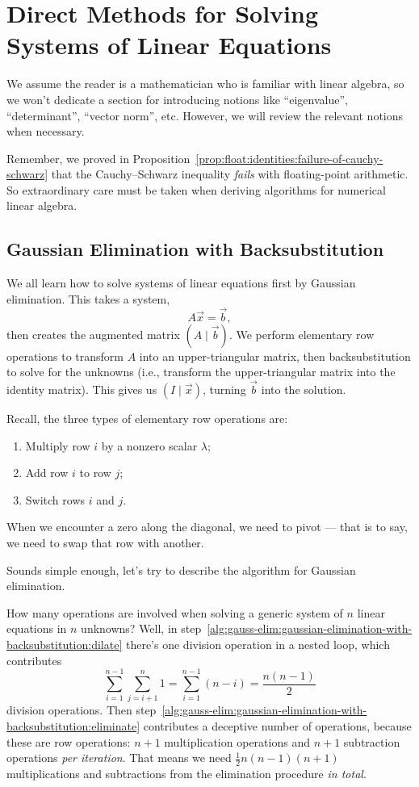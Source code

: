 \chapter{Direct Methods for Solving Systems of Linear Equations}

We assume the reader is a mathematician who is familiar with linear
algebra, so we won't dedicate a section for introducing notions like
``eigenvalue'', ``determinant'', ``vector norm'', etc. However, we will
review the relevant notions when necessary.

Remember, we proved in Proposition~\ref{prop:float:identities:failure-of-cauchy-schwarz}
that the Cauchy--Schwarz inequality \emph{fails} with floating-point
arithmetic. So extraordinary care must be taken when deriving algorithms
for numerical linear algebra.

\section{Gaussian Elimination with Backsubstitution}

We all learn how to solve systems of linear equations first by Gaussian
elimination. This takes a system,
\begin{equation}
A\vec{x}=\vec{b},
\end{equation}
then creates the augmented matrix $(A\mid\vec{b})$. We perform
elementary row operations to transform $A$ into an upper-triangular
matrix, then backsubstitution to solve for the unknowns (i.e., transform
the upper-triangular matrix into the identity matrix). This gives us
$(I\mid\vec{x})$, turning $\vec{b}$ into the solution.

Recall, the three types of elementary row operations are:
\begin{enumerate}
\item Multiply row $i$ by a nonzero scalar $\lambda$;
\item Add row $i$ to row $j$;
\item Switch rows $i$ and $j$.
\end{enumerate}
When we encounter a zero along the diagonal, we need to pivot --- that
is to say, we need to swap that row with another.

Sounds simple enough, let's try to describe the algorithm for Gaussian
elimination.

How many operations are involved when solving a generic system of $n$
linear equations in $n$ unknowns? Well, in
step~\ref{alg:gauss-elim:gaussian-elimination-with-backsubstitution:dilate}
there's one division operation in a nested loop, which contributes
\begin{equation}
\sum^{n-1}_{i=1}\sum^{n}_{j=i+1}1 = \sum^{n-1}_{i=1}(n-i) = \frac{n(n-1)}{2}
\end{equation}
division operations. Then step~\ref{alg:gauss-elim:gaussian-elimination-with-backsubstitution:eliminate}
contributes a deceptive number of operations, because these are row
operations: $n+1$ multiplication operations and $n+1$ subtraction
operations \emph{per iteration}. That means we need
$\frac{1}{2}n(n-1)(n+1)$ multiplications and subtractions from the
elimination procedure \emph{in total}.


